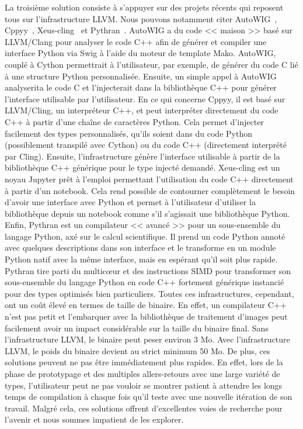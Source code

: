 La troisième solution consiste à s'appuyer sur des projets récents qui reposent tous sur l'infrastructure LLVM. Nous
pouvons notamment citer AutoWIG~\parencite{fernique.2018.autowig}, Cppyy~\parencite{wimtlplavrijsen.2016.cppyy},
Xeus-cling~\parencite{quantstack.2021.xeus-cling} et Pythran~\parencite{guelton.2015.pythran}. AutoWIG a du code <<
maison >> basé sur LLVM/Clang pour analyser le code C++ afin de générer et compiler une interface Python via Swig à
l'aide du moteur de template Mako. AutoWIG, couplé à Cython permettrait à l'utilisateur, par exemple, de générer du code
C lié à une structure Python personnalisée. Ensuite, un simple appel à AutoWIG analyserita le code C et l'injecterait
dans la bibliothèque C++ pour générer l'interface utilisable par l'utilisateur. En ce qui concerne Cppyy, il est basé
sur LLVM/Cling, un interpréteur C++, et peut interpréter directement du code C++ à partir d'une chaîne de caractères
Python. Cela permet d'injecter facilement des types personnalisés, qu'ils soient dans du code Python (possiblement
transpilé avec Cython) ou du code C++ (directement interprété par Cling). Ensuite, l'infrastructure génère l'interface
utilisable à partir de la bibliothèque C++ générique pour le type injecté demandé. Xeus-cling est un noyau Jupyter prêt
à l'emploi permettant l'utilisation du code C++ directement à partir d'un notebook. Cela rend possible de contourner
complètement le besoin d'avoir une interface avec Python et permet à l'utilisateur d'utiliser la bibliothèque depuis un
notebook comme s'il s'agissait une bibliothèque Python. Enfin, Pythran est un compilateur << avancé >> pour un
sous-ensemble du langage Python, axé sur le calcul scientifique. Il prend un code Python annoté avec quelques
descriptions dans son interface et le transforme en un module Python natif avec la même interface, mais en espérant
qu'il soit plus rapide. Pythran tire parti du multic\oe{}ur et des instructions SIMD pour transformer son sous-ensemble
du langage Python en code C++ fortement générique instancié pour des types optimisés bien particuliers. Toutes ces
infrastructures, cependant, ont un coût élevé en termes de taille de binaire. En effet, un compilateur C++ n'est pas
petit et l'embarquer avec la bibliothèque de traitement d'images peut facilement avoir un impact considérable sur la
taille du binaire final. Sans l'infrastructure LLVM, le binaire peut peser environ 3 Mo. Avec l'infrastructure LLVM, le
poids du binaire devient au strict minimum 50 Mo. De plus, ces solutions peuvent ne pas être immédiatement plus rapides.
En effet, lors de la phase de prototypage et des multiples allers-retours avec une large variété de types, l'utilisateur
peut ne pas vouloir se montrer patient à attendre les longs temps de compilation à chaque fois qu'il teste avec une
nouvelle itération de son travail. Malgré cela, ces solutions offrent d'excellentes voies de recherche pour l'avenir et
nous sommes impatient de les explorer.


